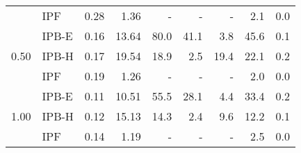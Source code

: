 \begin{tabular}{clrrrrrrr}
                      & IPF &                     0.28 &            1.36 &                    - &                          - &                  - &              2.1 &     0.0 \\[2pt]
\multirow{3}{*}{0.50} & IPB-E &                     0.16 &           13.64 &                 80.0 &                       41.1 &                3.8 &             45.6 &     0.1 \\
                      & IPB-H &                     0.17 &           19.54 &                 18.9 &                        2.5 &               19.4 &             22.1 &     0.2 \\
                      & IPF &                     0.19 &            1.26 &                    - &                          - &                  - &              2.0 &     0.0 \\[2pt]
\multirow{3}{*}{1.00} & IPB-E &                     0.11 &           10.51 &                 55.5 &                       28.1 &                4.4 &             33.4 &     0.2 \\
                      & IPB-H &                     0.12 &           15.13 &                 14.3 &                        2.4 &                9.6 &             12.2 &     0.1 \\
                      & IPF &                     0.14 &            1.19 &                    - &                          - &                  - &              2.5 &     0.0 \\
\bottomrule
\end{tabular}

